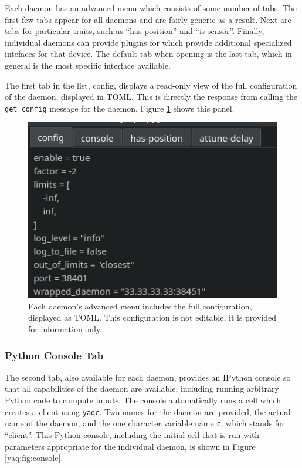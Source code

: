 Each daemon has an advanced menu which consists of some number of tabs.
The first few tabs appear for all daemons and are fairly generic as a result.
Next are tabs for particular traits, such as ``has-position'' and ``is-sensor''.
Finally, individual daemons can provide plugins for \yaqcqtpy{} which provide additional specialized intefaces for that device.
The default tab when opening is the last tab, which in general is the most specific interface available.

The first tab in the list, config, displays a read-only view of the full configuration of the daemon, displayed in TOML.
This is directly the response from calling the \texttt{get\_config} message for the daemon.
Figure \ref{yaq:fig:config} shows this panel.

\begin{figure}
\includegraphics[width=4.5in]{"yaq/images/config"}
\caption[\yaqcqtpy{} Configuration Tab]{
	Each daemon's advanced menu includes the full configuration, displayed as TOML.
	This configuration is not editable, it is provided for information only.
}
\label{yaq:fig:config}
\end{figure}

\subsubsection{Python Console Tab}

The second tab, also available for each daemon, provides an IPython\cite{IPython} console so that all capabilities of the daemon are available, including running arbitrary Python code to compute inputs.
The console automatically runs a cell which creates a client using \texttt{yaqc}.
Two names for the daemon are provided, the actual name of the daemon, and the one character variable name \texttt{c}, which stands for ``client''.
This Python console, including the initial cell that is run with parameters appropriate for the individual daemon, is shown in Figure \ref{yaq:fig:console}.

